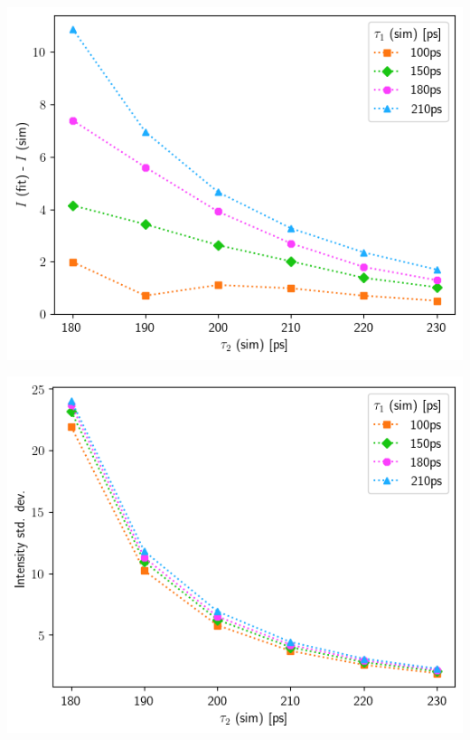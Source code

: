 {\begin{minipage}{ .47\linewidth}
    \includegraphics[width=\linewidth]{Batch 3/single Gaussian IRF/5050-diff i1.png}
    \label{fig:compirf-I-5050}
\end{minipage}
\hfill
\begin{minipage}{ .47\linewidth}
    \includegraphics[width=\linewidth]{Batch 3/single Gaussian IRF/5050-err i1.png}
    \label{fig:compirf-Ierr-5050}
\end{minipage}
\begin{minipage}{ .47\linewidth}

\end{minipage}}
